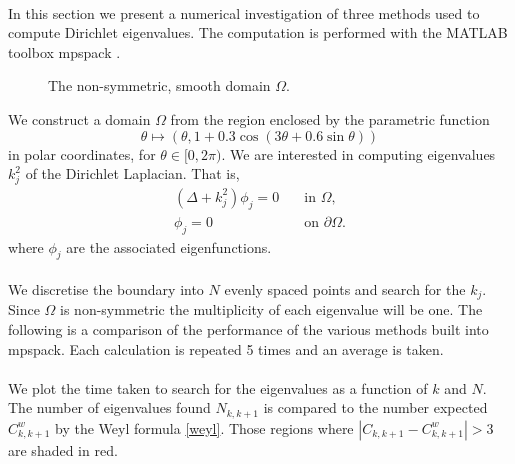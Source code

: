 \documentclass{article}
\begin{document}
\paragraph{}
In this section we present a numerical investigation of three methods used to compute Dirichlet eigenvalues.
The computation is performed with the MATLAB toolbox mpspack \cite{MPS}.
\begin{figure}[htbp]
\centering
{}
\caption{The non-symmetric, smooth domain $\Omega$.}
\end{figure}
We construct a domain $\Omega$ from the region enclosed by the parametric function
\[
\theta \mapsto (\theta, 1 + 0.3 \cos( 3 \theta + 0.6 \sin \theta))
\]
in polar coordinates, for $\theta \in [0, 2\pi)$.
We are interested in computing eigenvalues $k^2_j$ of the Dirichlet Laplacian. That is, \\
\begin{align*}
(\Delta + k_j^2) \phi_j = 0 & \quad \mbox{in } \Omega, \\
\phi_j  = 0 & \quad \mbox{on } \partial \Omega.
\end{align*}
where $\phi_j$ are the associated eigenfunctions.
\paragraph{}
We discretise the boundary into $N$ evenly spaced points and search for the $k_j$.
Since $\Omega$ is non-symmetric the multiplicity of each eigenvalue will be one.
The following is a comparison of the performance of the various methods built into mpspack.
Each calculation is repeated 5 times and an average is taken.
\paragraph{}
We plot the time taken to search for the eigenvalues as a function of $k$ and $N$.
The number of eigenvalues found $N_{k,k+1}$ is compared to the number expected $C^w_{k,k+1}$ by the Weyl formula \eqref{weyl}.
Those regions where $|C_{k,k+1} - C^w_{k,k+1}| > 3$ are shaded in red.
\end{document}
